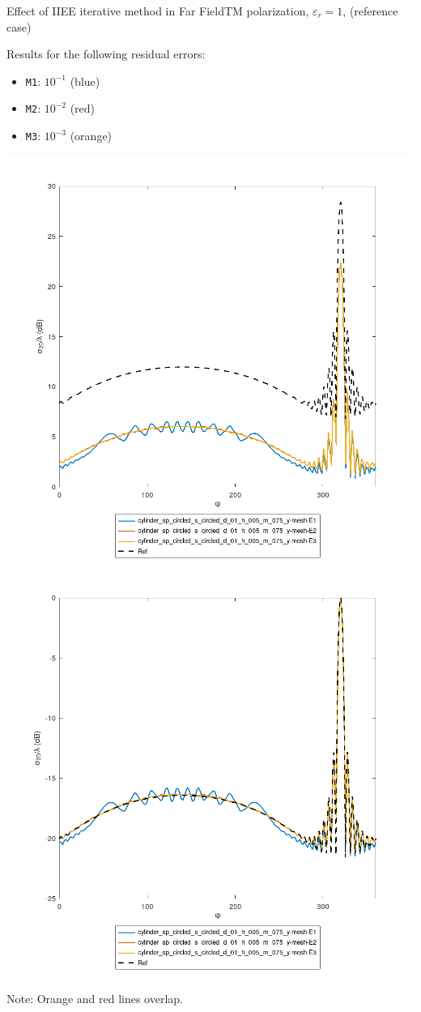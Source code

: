 
\begin{frame}{Effect of IIEE iterative method in Far Field}{TM polarization, $\varepsilon_r=1$, (reference case)}

Results for the following residual errors:
\begin{itemize}
\item \texttt{M1}: $10^{-1}$ (blue)
\item \texttt{M2}: $10^{-2}$ (red)
\item \texttt{M3}: $10^{-3}$ (orange)
\end{itemize}


\includegraphics[width=0.45\linewidth]{results/FF/cylD_01_H_005_M_075_Y/iiee075.png}
\hfill
\includegraphics[width=0.45\linewidth]{results/FF/cylD_01_H_005_M_075_Y/iiee075_norm.png}


Note: Orange and red lines overlap. 

\end{frame}
